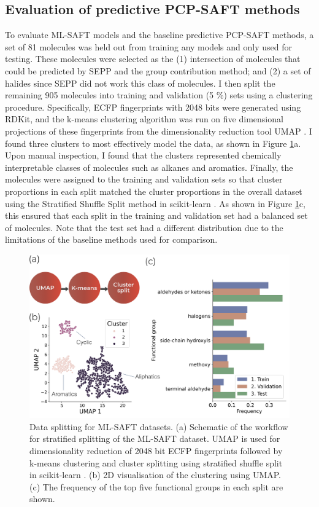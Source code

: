 \subsection{Evaluation of predictive PCP-SAFT methods}

To evaluate ML-SAFT models and the baseline predictive PCP-SAFT methods, a set of 81 molecules was held out from training any models and only used for testing. These molecules were selected as the (1) intersection of molecules that could be predicted by SEPP and the group contribution method; and (2) a set of halides since SEPP did not work this class of molecules. I then split the remaining 905 molecules into training and validation (5 \%) sets using a clustering procedure. Specifically, ECFP fingerprints with 2048 bits were generated using RDKit, and the k-means clustering algorithm \cite{MacQueen1967} was run on five dimensional projections of these fingerprints from the dimensionality reduction tool UMAP \cite{McInnes2018}. I found three clusters to most effectively model the data, as shown in Figure \ref{fig:splitting}a. Upon manual inspection, I found that the clusters represented chemically interpretable classes of molecules such as alkanes and aromatics. Finally, the molecules were assigned to the training and validation sets so that cluster proportions in each split matched the cluster proportions in the overall dataset using the Stratified Shuffle Split method in scikit-learn \cite{scikit-learn}. As shown in Figure \ref{fig:splitting}c, this ensured that each split in the training and validation set had a balanced set of molecules. Note that the test set had a different distribution due to the limitations of the baseline methods used for comparison.

\begin{figure}
    \centering
    \includegraphics[width=\textwidth]{gfx/Chapter08/cluster_split.png}
    \caption{Data splitting for ML-SAFT datasets. (a) Schematic of the workflow for stratified splitting of the ML-SAFT dataset. UMAP \cite{McInnes2018} is used for dimensionality reduction of 2048 bit ECFP fingerprints followed by k-means clustering \cite{MacQueen1967} and cluster splitting using stratified shuffle split in scikit-learn \cite{scikit-learn}. (b) 2D visualisation of the clustering using UMAP. (c) The frequency of the top five functional groups in each split are shown.}
    \label{fig:splitting}
\end{figure}

